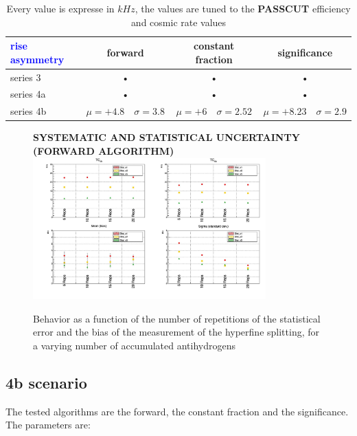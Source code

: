 \documentclass[11pt,a4paper,oneside]{article}
\newcommand{\commento}[1]{{\color{purple}{#1}}\vspace{10pt}}
\begin{document}
\begin{table}[hbtp]
\centering
\begin{tabular}{||p{40mm}|ccc||}
\textcolor{blue}{rise asymmetry } & forward & constant fraction & significance \\ 
\hline 
series 3  & • & • & • \\ 

series 4a & • & • & • \\ 
 
series 4b & $\mu = +4.8 \quad \sigma = 3.8$  & $\mu = +6 \quad \sigma = 2.52$ & $\mu = +8.23 \quad \sigma = 2.9$ \\ 
 
\end{tabular} 
\caption{Every value is expresse in $kHz$, the values are tuned to the \textbf{PASSCUT} efficiency and cosmic rate values}
\end{table}

\begin{figure}[hbtp]
\centering
\textbf{SYSTEMATIC AND STATISTICAL UNCERTAINTY (FORWARD ALGORITHM)} \\ \vspace{10pt}
\includegraphics[width = 0.8\textwidth]{statistic-variation.pdf}
\caption{Behavior as a function of the number of repetitions of the statistical error and the bias of the measurement of the hyperfine splitting, for a varying number of accumulated antihydrogens}
\commento{Rifare con il fondo che scala in base alla statistica utilizzata}
\end{figure}

\newpage
\subsection{4b scenario}

The tested algorithms are the forward, the constant fraction and the significance. The parameters are:
\end{document}
